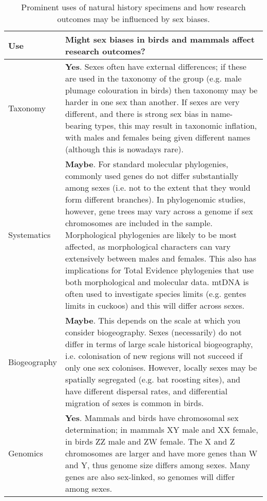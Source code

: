 
\begin{longtable}{p{3cm} p{16cm}}

\caption{Prominent uses of natural history specimens and how research outcomes may be influenced by sex biases.}\\ 
  
  \hline
  \textbf{Use} & \textbf{Might sex biases in birds and mammals affect research outcomes?}\\ 

  \hline
  Taxonomy & \textbf{Yes}. Sexes often have external differences; if these are used in the taxonomy of the group (e.g. male plumage colouration in birds\cite{paxton2009utility}) then taxonomy may be harder in one sex than another. If sexes are very different, and there is strong sex bias in name-bearing types, this may result in taxonomic inflation, with males and females being given different names (although this is nowadays rare).\\ 

  Systematics & \textbf{Maybe}. For standard molecular phylogenies, commonly used genes do not differ substantially among sexes (i.e. not to the extent that they would form different branches). In phylogenomic studies, however, gene trees may vary across a genome if sex chromosomes are included in the sample\cite{reddy2017}. Morphological phylogenies are likely to be most affected, as morphological characters can vary extensively between males and females. This also has implications for Total Evidence phylogenies that use both morphological and molecular data. mtDNA is often used to investigate species limits (e.g. gentes limits in cuckoos\cite{soler2009geographic}) and this will differ across sexes.\\ 

  Biogeography & \textbf{Maybe}. This depends on the scale at which you consider biogeography. Sexes (necessarily) do not differ in terms of large scale historical biogeography, i.e. colonisation of new regions will not succeed if only one sex colonises. However, locally sexes may be spatially segregated (e.g. bat roosting sites\cite{altringham}), and have different dispersal rates\cite{pusey1987sex}, and differential migration of sexes is common in birds\cite{Woodworth2016}.\\ 

  Genomics & \textbf{Yes}. Mammals and birds have chromosomal sex determination; in mammals XY male and XX female, in birds ZZ male and ZW female\cite{stevens1997sex}. The X and Z chromosomes are larger and have more genes than W and Y, thus genome size differs among sexes. Many genes are also sex-linked, so genomes will differ among sexes.\\ 


\end{longtable}
